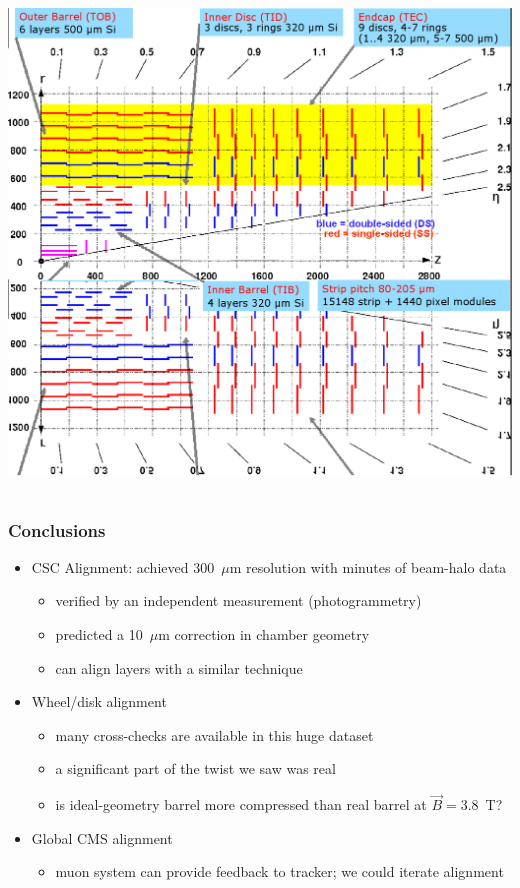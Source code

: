 \documentclass[compress]{beamer}
\begin{document}
\begin{frame}
\begin{columns}
\includegraphics[width=\linewidth]{tracker_map_outertop.png}
\end{columns}
\end{frame}

\begin{frame}
\frametitle{Conclusions}
\begin{itemize}\setlength{\itemsep}{0.5 cm}
\item CSC Alignment: achieved 300~$\mu$m resolution with minutes of beam-halo data
\begin{itemize}
\item verified by an independent measurement (photogrammetry)
\item predicted a 10~$\mu$m correction in chamber geometry
\item can align layers with a similar technique
\end{itemize}

\item Wheel/disk alignment
\begin{itemize}
\item many cross-checks are available in this huge dataset
\item a significant part of the twist we saw was real
\item is ideal-geometry barrel more compressed than real barrel at $\vec{B} = 3.8$~T?
\end{itemize}

\item Global CMS alignment
\begin{itemize}
\item muon system can provide feedback to tracker; we could iterate alignment
\end{itemize}

\end{itemize}
\label{numpages}
\end{frame}
\end{document}
